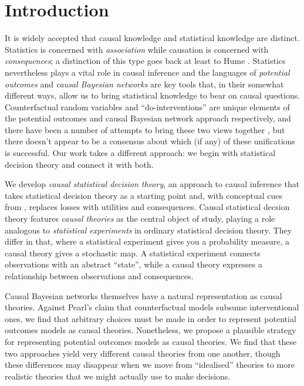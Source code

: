 
\section{Introduction}

\vspace{-3mm}

It is widely accepted that causal knowledge and statistical knowledge are distinct. Statistics is concerned with \emph{association} while causation is concerned with \emph{consequences}; a distinction of this type goes back at least to Hume \citep{morris_david_2019}. Statistics nevertheless plays a vital role in causal inference and the languages of \emph{potential outcomes} \citep{rubin_causal_2005} and \emph{causal Bayesian networks} \citep{pearl_causality:_2009} are key tools that, in their somewhat different ways, allow us to bring statistical knowledge to bear on causal questions. Counterfactual random variables and ``do-interventions'' are unique elements of the potential outcomes and causal Bayesian network approach respectively, and there have been a number of attempts to bring these two views together \cite{richardson2013single,shpitser_complete_2008,pearl_causality:_2009}, but there doesn't appear to be a consensus about which (if any) of these unifications is successful. Our work takes a different approach: we begin with statistical decision theory and connect it with both.

We develop \emph{causal statistical decision theory}, an approach to causal inference that takes statistical decision theory \citep{wald_statistical_1950} as a starting point and, with conceptual cues from \citet{savage_foundations_1972}, replaces losses with utilities and consequences. Causal statistical decsion theory features \emph{causal theories} as the central object of study, playing a role analogous to \emph{statistical experiments} in ordinary statistical decision theory. They differ in that, where a statistical experiment gives you a probability measure, a causal theory gives a stochastic map. A statistical experiment connects observations with an abstract ``state'', while a causal theory expresses a relationship between observations and consequences.

Causal Bayesian networks themselves have a natural representation as causal theories. Against Pearl's claim that counterfactual models subsume interventional ones, we find that arbitrary choices must be made in order to represent potential outcomes models as causal theories. Nonetheless, we propose a plausible strategy for representing potential outcomes models as causal theories. We find that these two approaches yield very different causal theories from one another, though these differences may disappear when we move from ``idealised'' theories to more realistic theories that we might actually use to make decisions.

